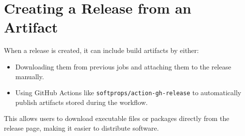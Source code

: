 \documentclass{article}
\begin{document}
\section{Creating a Release from an Artifact}
When a release is created, it can include build artifacts by either:
\begin{itemize}
    \item Downloading them from previous jobs and attaching them to the release manually.
    \item Using GitHub Actions like \texttt{softprops/action-gh-release} to automatically publish artifacts stored during the workflow.
\end{itemize}

This allows users to download executable files or packages directly from the release page, making it easier to distribute software.
\end{document}
